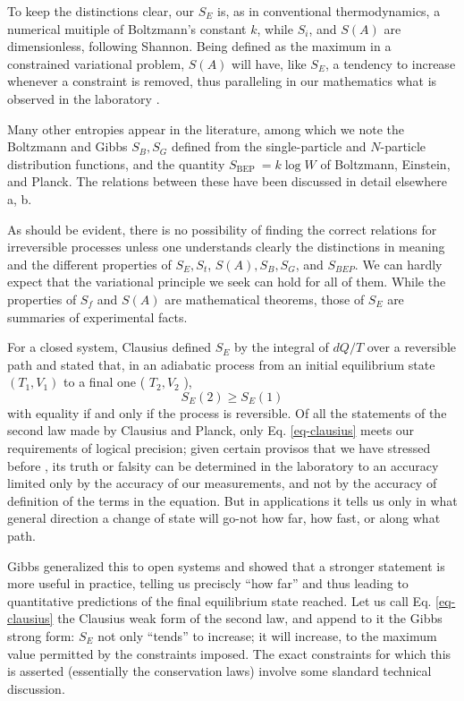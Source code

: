 \documentclass{article}
\begin{document}
To keep the distinctions clear, our $S_E$ is, as in conventional thermodynamics, a numerical muitiple of Boltzmann's constant $k$, while $S_i$, and $S(A)$ are dimensionless, following Shannon. Being defined as the maximum in a constrained variational problem, $S(A)$ will have, like $S_E$, a tendency to increase whenever a constraint is removed, thus paralleling in our mathematics what is observed in the laboratory \cite{jaynes1963}.

Many other entropies appear in the literature, among which we note the Boltzmann and Gibbs $S_B, S_G$ defined from the single-particle and $N$-particle distribution functions, and the quantity $S_{\text {BEP }}=k \log W$ of Boltzmann, Einstein, and Planck. The relations between these have been discussed in detail elsewhere \cite{jaynes1965} a, b.

As should be evident, there is no possibility of finding the correct relations for irreversible processes unless one understands clearly the distinctions in meaning and the different properties of $S_E, S_t$, $S(A), S_B, S_G$, and $S_{B E P}$. We can hardly expect that the variational principle we seek can hold for all of them. While the properties of $S_f$ and $S(A)$ are mathematical theorems, those of $S_E$ are summaries of experimental facts.

For a closed system, Clausius defined $S_E$ by the integral of $d Q / T$ over a reversible path and stated that, in an adiabatic process from an initial equilibrium state $\left(T_1, V_1\right)$ to a final one ( $T_2, V_2$ ),
\begin{equation}
S_E(2) \geqslant S_E(1) \label{eq-clausius}
\end{equation}
with equality if and only if the process is reversible. Of all the statements of the second law made by Clausius and Planck, only Eq. \ref{eq-clausius} meets our requirements of logical precision; given certain provisos that we have stressed before \cite{jaynes1965}, its truth or falsity can be determined in the laboratory to an accuracy limited only by the accuracy of our measurements, and not by the accuracy of definition of the terms in the equation. But in applications it tells us only in what general direction a change of state will go-not how far, how fast, or along what path.

Gibbs \cite{gibbs1876} generalized this to open systems and showed that a stronger statement is more useful in practice, telling us preciscly ``how far'' and thus leading to quantitative predictions of the final equilibrium state reached. Let us call Eq. \ref{eq-clausius} the Clausius weak form of the second law, and append to it the Gibbs strong form: $S_E$ not only ``tends'' to increase; it will increase, to the maximum value permitted by the constraints imposed. The exact constraints for which this is asserted (essentially the conservation laws) involve some slandard technical discussion.
\end{document}
